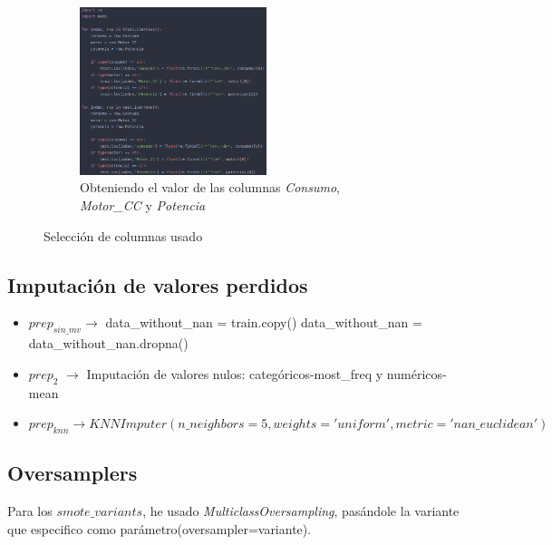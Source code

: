 \begin{figure}[H]
\begin{figure}[H]
\centering
\includegraphics[width=0.6\textwidth]{imagenes/er.png}
\caption{Obteniendo el valor de las columnas \textit{Consumo}, \textit{Motor\_CC} y \textit{Potencia}}
\end{figure}

\caption{Selección de columnas usado}
\label{fig:fig}
\end{figure}

\subsection{Imputación de valores perdidos}

\begin{itemize}

\item $prep_{sin\_mv} \rightarrow$ data\_without\_nan = train.copy()
\newline	
	data\_without\_nan = data\_without\_nan.dropna()
	
\item $prep_{2}$ $\rightarrow $ Imputación de valores nulos: categóricos-most\_freq y numéricos-mean

\item $prep_{knn} \rightarrow  KNNImputer(n\_neighbors=5, weights='uniform', metric='nan\_euclidean')$

\end{itemize}

\subsection{Oversamplers}

Para los $smote\_variants$, he usado \textit{MulticlassOversampling}, pasándole la variante que especifico como parámetro(oversampler=variante).


